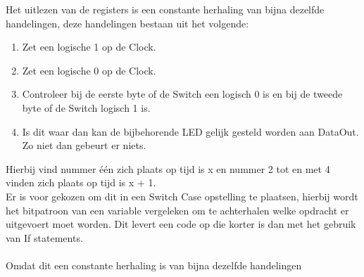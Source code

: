 Het uitlezen van de registers is een constante herhaling van bijna dezelfde handelingen, deze handelingen bestaan uit het volgende:
\begin{enumerate}
	\item Zet een logische 1 op de Clock.
	\item Zet een logische 0 op de Clock. 
	\item Controleer bij de eerste byte of de Switch een logisch 0 is en bij de tweede byte of de Switch logisch 1 is.
	\item Is dit waar dan kan de bijbehorende LED gelijk gesteld worden aan DataOut.
	Zo niet dan gebeurt er niets.
\end{enumerate}
Hierbij vind nummer één zich plaats op tijd is x en nummer 2 tot en met 4 vinden zich plaats op tijd is x + 1.\\

Er is voor gekozen om dit in een Switch Case opstelling te plaatsen, hierbij wordt het bitpatroon van een variable vergeleken om te achterhalen welke opdracht er uitgevoert moet worden. Dit levert een code op die korter is dan met het gebruik van If statements.\\


\\Omdat dit een constante herhaling is van bijna dezelfde handelingen 